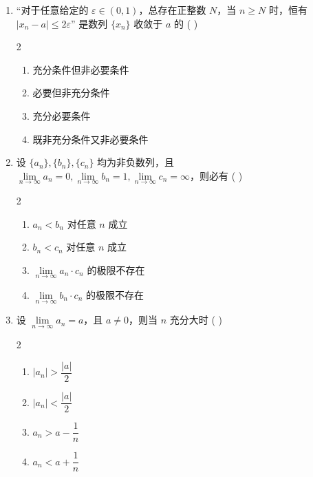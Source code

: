 \begin{enumerate}[label=\textbf{\arabic*.}, itemsep=3cm]
    \item “对于任意给定的 $\varepsilon \in (0,1)$，总存在正整数 $N$，当 $n \ge N$ 时，恒有 $|x_n - a| \le 2\varepsilon$” 是数列 $\{x_n\}$ 收敛于 $a$ 的 ( \quad )
    \begin{multicols}{2}
    \begin{enumerate}[label=(\Alph*)]
        \item 充分条件但非必要条件
        \item 必要但非充分条件
        \item 充分必要条件
        \item 既非充分条件又非必要条件
    \end{enumerate}
    \end{multicols}

    \item 设 $\{a_n\}, \{b_n\}, \{c_n\}$ 均为非负数列，且 $\lim\limits_{n \to \infty} a_n = 0, \lim\limits_{n \to \infty} b_n = 1, \lim\limits_{n \to \infty} c_n = \infty$，则必有 ( \quad )
    \begin{multicols}{2}
    \begin{enumerate}[label=(\Alph*)]
        \item $a_n < b_n$ 对任意 $n$ 成立
        \item $b_n < c_n$ 对任意 $n$ 成立
        \item $\lim\limits_{n \to \infty} a_n \cdot c_n$ 的极限不存在
        \item $\lim\limits_{n \to \infty} b_n \cdot c_n$ 的极限不存在
    \end{enumerate}
    \end{multicols}

    \item 设 $\lim\limits_{n \to \infty} a_n = a$，且 $a \ne 0$，则当 $n$ 充分大时 ( \quad )
    \begin{multicols}{2}
    \begin{enumerate}[label=(\Alph*)]
        \item $|a_n| > \dfrac{|a|}{2}$
        \item $|a_n| < \dfrac{|a|}{2}$
        \item $a_n > a - \dfrac{1}{n}$
        \item $a_n < a + \dfrac{1}{n}$
    \end{enumerate}
    \end{multicols}


\end{enumerate}
